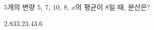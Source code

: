 $5$개의 변량 $5$, $7$, $10$, $8$, $x$의 평균이 $8$일 때, 분산은?
\begin{choices32}{$2.8$}{$3$}{$3.2$}{$3.4$}{$3.6$}\end{choices32}

